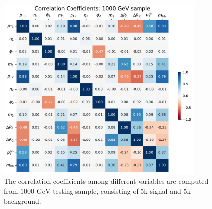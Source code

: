 \documentclass[12pt]{article}
\begin{document}
		\begin{figure}[htpb]
			\centering
			\includegraphics[width=0.9\textwidth]{correlation_coefficients-1000GeV.pdf}
			\caption{The correlation coefficients among different variables are computed from $\text{1000 GeV}$ testing sample, consisting of 5k signal and 5k background.}
			\label{fig:correlation_coefficient_1000GeV}
		\end{figure}
\end{document}
